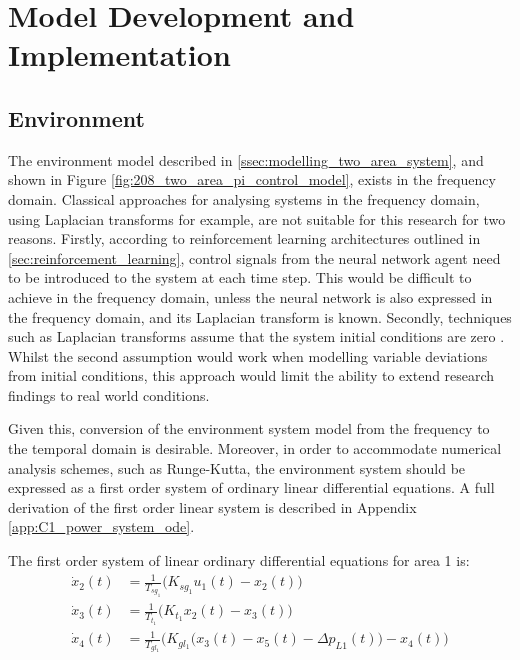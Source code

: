 \section{Model Development and Implementation}


\subsection{Environment} \label{ssec:env_modelling}
The environment model described in \textsection \ref{ssec:modelling_two_area_system}, and shown in Figure \ref{fig:208_two_area_pi_control_model}, exists in the frequency domain. Classical approaches for analysing systems in the frequency domain, using Laplacian transforms for example, are not suitable for this research for two reasons. Firstly, according to reinforcement learning architectures outlined in \textsection \ref{sec:reinforcement_learning}, control signals from the neural network agent need to be introduced to the system at each time step. This would be difficult to achieve in the frequency domain, unless the neural network is also expressed in the frequency domain, and its Laplacian transform is known. Secondly, techniques such as Laplacian transforms assume that the system initial conditions are zero \cite{Ogat2010}. Whilst the second assumption would work when modelling variable deviations from initial conditions, this approach would limit the ability to extend research findings to real world conditions.

Given this, conversion of the environment system model from the frequency to the temporal domain is desirable. Moreover, in order to accommodate numerical analysis schemes, such as Runge-Kutta, the environment system should be expressed as a first order system of ordinary linear differential equations. A full derivation of the first order linear system is described in Appendix \ref{app:C1_power_system_ode}.

The first order system of linear ordinary differential equations for area 1 is:
\begin{align}
	\dot{x}_2(t) &= \frac{1}{T_{sg_1}}\big( K_{sg_1} u_1(t) - x_2(t) \big) \label{eq:4101} \\
	\dot{x}_3(t) &= \frac{1}{T_{t_1}} \big( K_{t_1} x_2(t) - x_3(t) \big) \label{eq:4102} \\
	\dot{x}_4(t) &= \frac{1}{T_{gl_1}} \bigg( K_{gl_1} \big( x_3(t) - x_5(t) - \Delta p_{L1}(t) \big) - x_4(t) \label{eq:4103} \bigg)
\end{align}
	
